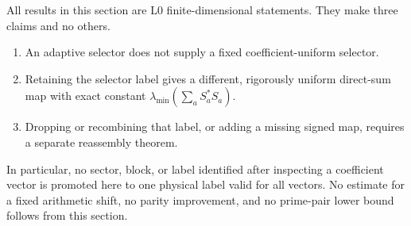 All results in this section are L0 finite-dimensional statements.  They
make three claims and no others.
\begin{enumerate}[label=\textup{(\roman*)},leftmargin=2.4em]
 \item An adaptive selector does not supply a fixed coefficient-uniform
       selector.
 \item Retaining the selector label gives a different, rigorously uniform
       direct-sum map with exact constant
       \(\lambda_{\min}(\sum_aS_a^*S_a)\).
 \item Dropping or recombining that label, or adding a missing signed map,
       requires a separate reassembly theorem.
\end{enumerate}
In particular, no sector, block, or label identified after inspecting a
coefficient vector is promoted here to one physical label valid for all
vectors.  No estimate for a fixed arithmetic shift, no parity
improvement, and no prime-pair lower bound follows from this section.
